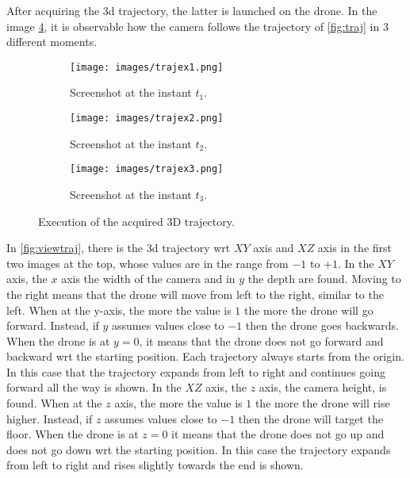 \noindent After acquiring the \gls{3d} trajectory, the latter is launched on the drone. In the image \ref{fig:trajex}, it is observable how the camera follows the trajectory of \ref{fig:traj} in $3$ different moments. \\

\begin{figure}
    \centering
    \begin{subfigure}[b]{0.65 \textwidth}
        \centering
        \texttt{[image: images/trajex1.png]}
        \caption[]{Screenshot at the instant $t_1$.}
        \label{fig:trajex1}
    \end{subfigure}
    \hfill
    \begin{subfigure}[b]{0.65 \textwidth}
        \centering
        \texttt{[image: images/trajex2.png]}
        \caption[]{Screenshot at the instant $t_2$.}
        \label{fig:trajex2}
    \end{subfigure}
    \hfill
    \begin{subfigure}[b]{0.65 \textwidth}
        \centering
        \texttt{[image: images/trajex3.png]}
        \caption[]{Screenshot at the instant $t_3$.}
        \label{fig:trajex3}
    \end{subfigure}
    \caption[Execution of the acquired 3D trajectory.]{Execution of the acquired 3D trajectory.}
    \label{fig:trajex}
\end{figure}

\noindent In \ref{fig:viewtraj}, there is the \gls{3d} trajectory \gls{wrt} $XY$ axis and $XZ$ axis in the first two images at the top, whose values are in the range from $-1$ to $+1$. In the $XY$ axis, the $x$ axis the width of the camera and in $y$ the depth are found. Moving to the right means that the drone will move from left to the right, similar to the left. When at the y-axis, the more the value is $1$ the more the drone will go forward. Instead, if $y$ assumes values close to $-1$ then the drone goes backwards. When the drone is at $y=0$, it means that the drone does not go forward and backward \gls{wrt} the starting position. Each trajectory always starts from the origin. In this case that the trajectory expands from left to right and continues going forward all the way is shown. In the $XZ$ axis, the $z$ axis, the camera height, is found. When at the $z$ axis, the more the value is $1$ the more the drone will rise higher. Instead, if $z$ assumes values close to $-1$ then the drone will target the floor. When the drone is at $z=0$ it means that the drone does not go up and does not go down \gls{wrt} the starting position. In this case the trajectory expands from left to right and rises slightly towards the end is shown. \\

